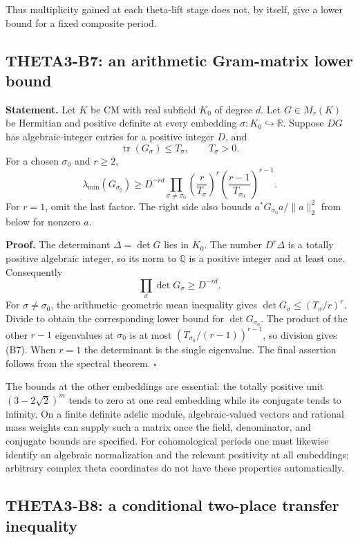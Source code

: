 \documentclass[11pt]{article}
\newcommand{\Q}{\mathbb Q}\newcommand{\C}{\mathbb C}\newcommand{\Z}{\mathbb Z}\newcommand{\R}{\mathbb R}\newcommand{\A}{\mathbb A}\newcommand{\OO}{\mathcal O}
\theoremstyle{definition}\newtheorem{definition}[theorem]{Definition}\newtheorem{remark}[theorem]{Remark}
\begin{document}
Thus multiplicity gained at each theta-lift stage does not, by itself, give a lower bound for a fixed composite period.

\subsection{THETA3-B7: an arithmetic Gram-matrix lower bound}\label{B7}

\textbf{Statement.} Let $K$ be CM with real subfield $K_0$ of degree $d$. Let $G\in M_r(K)$ be Hermitian and positive definite at every embedding $\sigma:K_0\hookrightarrow\R$. Suppose $DG$ has algebraic-integer entries for a positive integer $D$, and
\[
 \operatorname{tr}(G_\sigma)\leq T_\sigma,\qquad T_\sigma>0.
\]
For a chosen $\sigma_0$ and $r\geq2$,
\[
 \lambda_{\min}(G_{\sigma_0})\geq
 D^{-rd}\prod_{\sigma\ne\sigma_0}\left(\frac r{T_\sigma}\right)^r
       \left(\frac{r-1}{T_{\sigma_0}}\right)^{r-1}.
 \tag{B7}
\]
For $r=1$, omit the last factor. The right side also bounds
$a^*G_{\sigma_0}a/\|a\|_2^2$ from below for nonzero $a$.

\textbf{Proof.} The determinant $\Delta=\det G$ lies in $K_0$. The number $D^r\Delta$ is a totally positive algebraic integer, so its norm to $\Q$ is a positive integer and at least one. Consequently
\[
 \prod_\sigma\det G_\sigma\geq D^{-rd}.
\]
For $\sigma\ne\sigma_0$, the arithmetic--geometric mean inequality gives
$\det G_\sigma\leq(T_\sigma/r)^r$. Divide to obtain the corresponding lower bound for $\det G_{\sigma_0}$. The product of the other $r-1$ eigenvalues at $\sigma_0$ is at most $(T_{\sigma_0}/(r-1))^{r-1}$, so division gives (B7). When $r=1$ the determinant is the single eigenvalue. The final assertion follows from the spectral theorem. \hfill$\square$

The bounds at the other embeddings are essential: the totally positive unit $(3-2\sqrt2)^m$ tends to zero at one real embedding while its conjugate tends to infinity. On a finite definite adelic module, algebraic-valued vectors and rational mass weights can supply such a matrix once the field, denominator, and conjugate bounds are specified. For cohomological periods one must likewise identify an algebraic normalization and the relevant positivity at all embeddings; arbitrary complex theta coordinates do not have these properties automatically.

\subsection{THETA3-B8: a conditional two-place transfer inequality}\label{B8}
\end{document}
